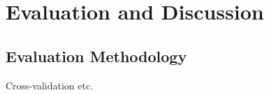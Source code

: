 \def\baselinestretch{1}

\chapter{Evaluation and Discussion}



\smallskip

\goodbreak

\section{Evaluation Methodology}
Cross-validation etc. 

\bigskip

\def\baselinestretch{1.66}




